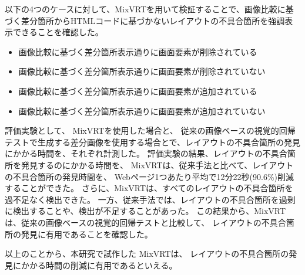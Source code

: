 \documentclass[uplatex, report, a4j, 10pt]{jsbook}
\newcommand{\toolName}{MixVRT}  %
\begin{document}
\par
以下の4つのケースに対して、\toolName を用いて検証することで、画像比較に基づく差分箇所からHTMLコードに基づかないレイアウトの不具合箇所を強調表示できることを確認した。
\begin{itemize}
      \item 画像比較に基づく差分箇所表示通りに画面要素が削除されている
      \item 画像比較に基づく差分箇所表示通りに画面要素が削除されていない
      \item 画像比較に基づく差分箇所表示通りに画面要素が追加されている
      \item 画像比較に基づく差分箇所表示通りに画面要素が追加されていない
\end{itemize}
\par
評価実験として、
\toolName を使用した場合と、
従来の画像ベースの視覚的回帰テストで生成する差分画像を使用する場合とで、レイアウトの不具合箇所の発見にかかる時間を、それぞれ計測した。
評価実験の結果、レイアウトの不具合箇所を発見するのにかかる時間を、
\toolName は、従来手法と比べて、レイアウトの不具合箇所の発見時間を、
Webページ1つあたり平均で12分22秒(90.6\%)削減することができた。
さらに、\toolName は、すべてのレイアウトの不具合箇所を過不足なく検出できた。
一方、従来手法では、レイアウトの不具合箇所を過剰に検出することや、検出が不足することがあった。
この結果から、\toolName は、従来の画像ベースの視覚的回帰テストと比較して、
レイアウトの不具合箇所の発見に有用であることを確認した。
\par
以上のことから、本研究で試作した \toolName は、
レイアウトの不具合箇所の発見にかかる時間の削減に有用であるといえる。


%
% 








%


%

\end{document}
